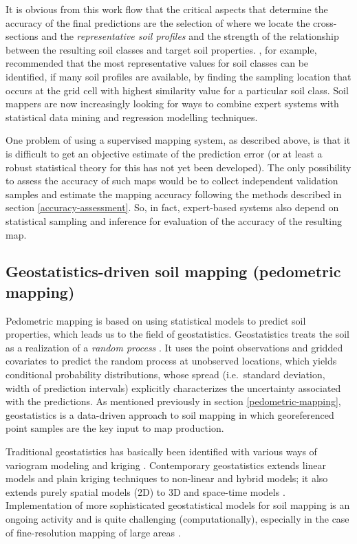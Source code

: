 \documentclass[graybox,natbib,nospthms,UStrade]{svmono}
\begin{document}
It is obvious from this work flow that the critical aspects that
determine the accuracy of the final predictions are the selection of
where we locate the cross-sections and the \emph{representative soil
profiles} and the strength of the relationship between the resulting
soil classes and target soil properties. \citet{Qi2006Geoderma}, for example,
recommended that the most representative values for soil classes can be
identified, if many soil profiles are available, by finding the sampling
location that occurs at the grid cell with highest similarity value for a
particular soil class. Soil mappers are now increasingly looking for
ways to combine expert systems with statistical data mining and
regression modelling techniques.

One problem of using a supervised mapping system, as described above, is
that it is difficult to get an objective estimate of the prediction
error (or at least a robust statistical theory for this has not yet been
developed). The only possibility to assess the accuracy of such maps would
be to collect independent validation samples and estimate the mapping
accuracy following the methods described in
section \ref{accuracy-assessment}. So, in fact, expert-based
systems also depend on statistical sampling and inference for evaluation of
the accuracy of the resulting map.

\hypertarget{regression-kriging}{%
\subsection{Geostatistics-driven soil mapping (pedometric mapping)}\label{regression-kriging}}

Pedometric mapping is based on using statistical models to predict soil
properties, which leads us to the field of geostatistics. Geostatistics
treats the soil as a realization of a \emph{random process}
\citep{Webster2001Wiley}. It uses the point observations and gridded covariates to predict
the random process at unobserved locations, which yields conditional
probability distributions, whose spread (i.e.~standard deviation, width
of prediction intervals) explicitly characterizes the uncertainty
associated with the predictions. As mentioned previously in
section \ref{pedometric-mapping}, geostatistics is a data-driven approach to
soil mapping in which georeferenced point samples are the key input to
map production.

Traditional geostatistics has basically been identified with various
ways of variogram modeling and kriging \citep{Haining2010GEAN780}.
Contemporary geostatistics extends linear models and plain kriging
techniques to non-linear and hybrid models; it also extends purely
spatial models (2D) to 3D and space-time models
\citep{schabenberger2005statistical, Bivand2008Springer, Diggle2007Springer, cressie2011statistics}.
Implementation of more sophisticated geostatistical models for soil
mapping is an ongoing activity and is quite challenging
(computationally), especially in the case of fine-resolution mapping of
large areas \citep{Hengl2017SoilGrids250m}.
\end{document}
